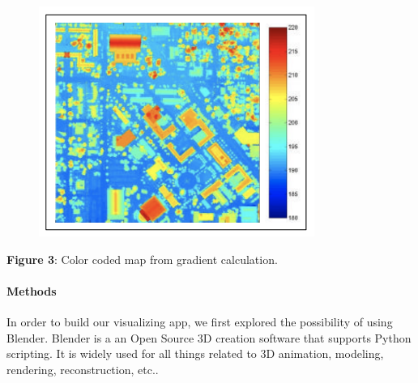 \documentclass[12pt]{report}
\begin{document}
\begin{figure}[H]
	\begin{Center}
		\includegraphics[width=3.54in,height=2.96in]{./media/image12.png}
	\end{Center}
\end{figure}



\begin{Center}
 
\end{Center}\par

\tab \tab \textbf{Figure 3}: Color coded map from gradient calculation.\par


\vspace{\baselineskip}
\paragraph*{Methods}
\tab In order to build our visualizing app, we first explored the possibility of using Blender. Blender is a an Open Source 3D creation software that supports Python scripting. It is widely used for all things related to 3D animation, modeling, rendering, reconstruction, etc.. \par


\vspace{\baselineskip}


\end{document}

